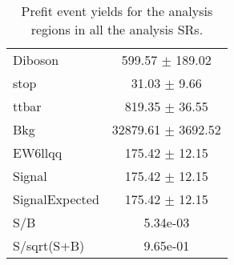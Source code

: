 \begin{table}[h]
{\begin{tabular}{|l|c|}
Diboson & 599.57 $\pm$ 189.02\\
stop & 31.03 $\pm$ 9.66\\
ttbar & 819.35 $\pm$ 36.55\\
\hline
Bkg & 32879.61 $\pm$ 3692.52\\
\hline
EW6llqq & 175.42 $\pm$ 12.15\\
\hline
Signal & 175.42 $\pm$ 12.15\\
SignalExpected & 175.42 $\pm$ 12.15\\
\hline
S/B & 5.34e-03\\
S/sqrt(S+B) & 9.65e-01\\ \hline
\end{tabular}
}
\label{tab:ComboPrefitYield_SR}
\caption{Prefit event yields for the analysis regions in all the analysis SRs.}
\end{table}

\clearpage


